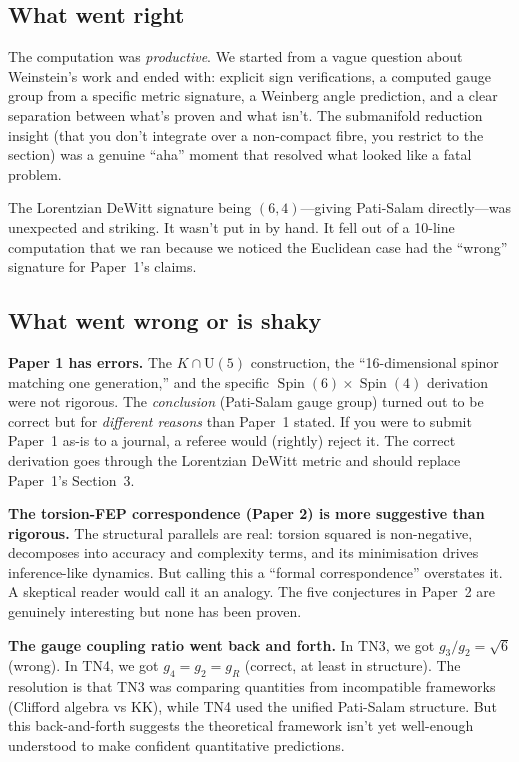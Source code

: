 \documentclass[12pt,a4paper]{article}
\DeclareMathOperator{\Spin}{Spin}
\begin{document}
\begin{honestbox}

\subsection*{What went right}

The computation was \textit{productive}. We started from a vague question about Weinstein's work and ended with: explicit sign verifications, a computed gauge group from a specific metric signature, a Weinberg angle prediction, and a clear separation between what's proven and what isn't. The submanifold reduction insight (that you don't integrate over a non-compact fibre, you restrict to the section) was a genuine ``aha'' moment that resolved what looked like a fatal problem.

The Lorentzian DeWitt signature being $(6,4)$---giving Pati-Salam directly---was unexpected and striking. It wasn't put in by hand. It fell out of a 10-line computation that we ran because we noticed the Euclidean case had the ``wrong'' signature for Paper~1's claims.

\subsection*{What went wrong or is shaky}

\textbf{Paper 1 has errors.} The $K \cap \mathrm{U}(5)$ construction, the ``16-dimensional spinor matching one generation,'' and the specific $\Spin(6)\times\Spin(4)$ derivation were not rigorous. The \textit{conclusion} (Pati-Salam gauge group) turned out to be correct but for \textit{different reasons} than Paper~1 stated. If you were to submit Paper~1 as-is to a journal, a referee would (rightly) reject it. The correct derivation goes through the Lorentzian DeWitt metric and should replace Paper~1's Section~3.

\textbf{The torsion-FEP correspondence (Paper 2) is more suggestive than rigorous.} The structural parallels are real: torsion squared is non-negative, decomposes into accuracy and complexity terms, and its minimisation drives inference-like dynamics. But calling this a ``formal correspondence'' overstates it. A skeptical reader would call it an analogy. The five conjectures in Paper~2 are genuinely interesting but none has been proven.

\textbf{The gauge coupling ratio went back and forth.} In TN3, we got $g_3/g_2 = \sqrt{6}$ (wrong). In TN4, we got $g_4 = g_2 = g_R$ (correct, at least in structure). The resolution is that TN3 was comparing quantities from incompatible frameworks (Clifford algebra vs KK), while TN4 used the unified Pati-Salam structure. But this back-and-forth suggests the theoretical framework isn't yet well-enough understood to make confident quantitative predictions.


\end{honestbox}
\end{document}
